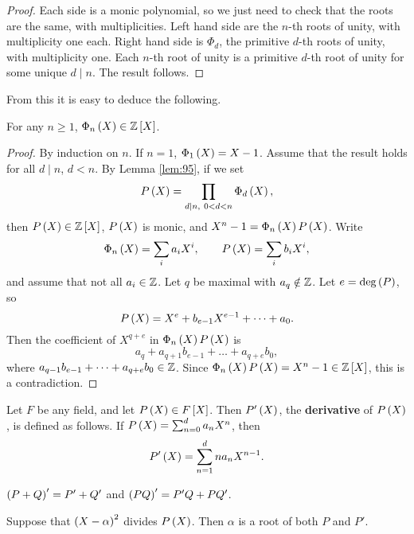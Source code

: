 \begin{proof}
Each side is a monic polynomial, so we just need to check that the roots are the same, with multiplicities. Left hand side are the $ n $-th roots of unity, with multiplicity one each. Right hand side is $ \Phi_d $, the primitive $ d $-th roots of unity, with multiplicity one. Each $ n $-th root of unity is a primitive $ d $-th root of unity for some unique $ d \mid n $. The result follows.
\end{proof}

From this it is easy to deduce the following.

\begin{lemma}
For any $ n \ge 1 $, $ \Phi_n\left( X \right) \in \mathbb{Z}\left[ X \right] $.
\end{lemma}

\begin{proof}
By induction on $ n $. If $ n = 1 $, $ \Phi_1\left( X \right) = X - 1 $. Assume that the result holds for all $ d \mid n $, $ d < n $. By Lemma \ref{lem:95}, if we set
$$ P\left( X \right) = \prod_{d \mid n, \ 0 < d < n} \Phi_d\left( X \right), $$
then $ P\left( X \right) \in \mathbb{Z}\left[ X \right] $, $ P\left( X \right) $ is monic, and $ X^n - 1 = \Phi_n\left( X \right)P\left( X \right) $. Write
$$ \Phi_n\left( X \right) = \sum_i a_iX^i, \qquad P\left( X \right) = \sum_i b_iX^i, $$
and assume that not all $ a_i \in \mathbb{Z} $. Let $ q $ be maximal with $ a_q \notin \mathbb{Z} $. Let $ e = \deg\left( P \right) $, so
$$ P\left( X \right) = X^e + b_{e - 1}X^{e - 1} + \dots + a_0. $$
Then the coefficient of $ X^{q + e} $ in $ \Phi_n\left( X \right)P\left( X \right) $ is
$$ a_q + a_{q + 1}b_{e - 1} + \dots + a_{q + e}b_0, $$
where $ a_{q - 1}b_{e - 1} + \dots + a_{q + e}b_0 \in \mathbb{Z} $. Since $ \Phi_n\left( X \right)P\left( X \right) = X^n - 1 \in \mathbb{Z}\left[ X \right] $, this is a contradiction.
\end{proof}

\begin{definition}
Let $ F $ be any field, and let $ P\left( X \right) \in F\left[ X \right] $. Then $ P'\left( X \right) $, the \textbf{derivative} of $ P\left( X \right) $, is defined as follows. If $ P\left( X \right) = \sum_{n = 0}^d a_nX^n $, then
$$ P'\left( X \right) = \sum_{n = 1}^d na_nX^{n - 1}. $$
\end{definition}

\begin{note}
$ \left( P + Q \right)' = P' + Q' $ and $ \left( PQ \right)' = P'Q + PQ' $.
\end{note}

\begin{lemma}
\label{lem:98}
Suppose that $ \left( X - \alpha \right)^2 $ divides $ P\left( X \right) $. Then $ \alpha $ is a root of both $ P $ and $ P' $.
\end{lemma}

